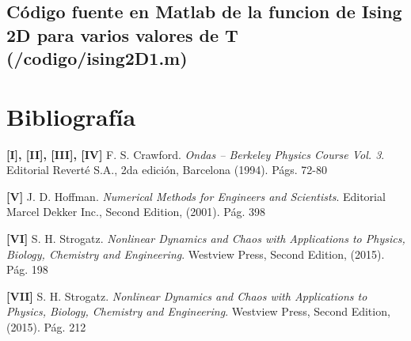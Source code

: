 \documentclass[a4paper,12pt]{article}
\begin{document}


\subsection{C\'odigo fuente en Matlab de la funcion de Ising 2D para varios valores de T (/codigo/ising2D1.m)}





\newpage
\section{Bibliograf\'ia}
\textbf{[I], [II], [III], [IV]} F. S. Crawford. \textit{Ondas – Berkeley Physics Course Vol. 3}. Editorial Revert\'e S.A., 2da edici\'on, Barcelona (1994). P\'ags. 72-80

\textbf{[V]} J. D. Hoffman. \textit{Numerical Methods for Engineers and Scientists}. Editorial Marcel Dekker Inc., Second Edition, (2001). P\'ag. 398

\textbf{[VI]} S. H. Strogatz. \textit{Nonlinear Dynamics and Chaos with Applications to Physics, Biology, Chemistry and Engineering}. Westview Press, Second Edition, (2015). P\'ag. 198

\textbf{[VII]} S. H. Strogatz. \textit{Nonlinear Dynamics and Chaos with Applications to Physics, Biology, Chemistry and Engineering}. Westview Press, Second Edition, (2015). P\'ag. 212
\end{document}
